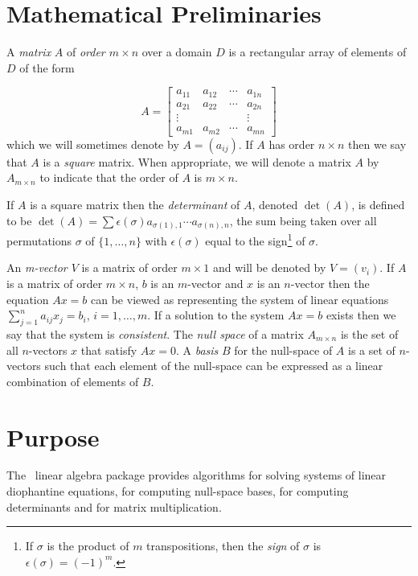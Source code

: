 \section{Mathematical Preliminaries}
A {\em matrix} $A$ of {\em order $m \times n$} over a domain $D$ is a
rectangular array of elements of $D$ of the form

$$A = \left[
\begin{array}{cccc}
a_{11} & a_{12} & \cdots & a_{1n} \\
a_{21} & a_{22} & \cdots & a_{2n} \\
\vdots &        &        & \vdots \\
a_{m1} & a_{m2} & \cdots & a_{mn}
\end{array}
\right]$$
which we will sometimes denote by $A = (a_{ij})$.  If $A$ has order $n
\times n$ then we say that $A$ is a {\em square} matrix.  When
appropriate, we will denote a matrix $A$ by $A_{m \times n}$ to
indicate that the order of $A$ is $m \times n$.

If $A$ is a square matrix then the {\em determinant} of $A$, denoted
$\det(A)$, is defined to be $\det(A) =
\sum \epsilon(\sigma)a_{\sigma(1),1}\cdots a_{\sigma(n),n}$,
the sum being taken over all permutations $\sigma$ of $\{1,\ldots,n\}$
with $\epsilon(\sigma)$ equal to the sign\footnote{If $\sigma$ is the
product of $m$ transpositions, then the {\em sign} of $\sigma$ is
$\epsilon(\sigma) = (-1)^m$.} of $\sigma$.

An {\em m-vector $V$} is a matrix of order $m \times 1$ and will be
denoted by $V = (v_i)$. If $A$ is a matrix of order $m \times n$, $b$
is an $m$-vector and $x$ is an $n$-vector then the equation $Ax = b$
can be viewed as representing the system of linear equations
$\sum_{j=1}^n a_{ij}x_j = b_i$, $i = 1,\ldots,m$. If a solution to the
system $Ax = b$ exists then we say that the system is {\em
consistent}. The {\em null space} of a matrix $A_{m \times n}$ is the
set of all $n$-vectors $x$ that satisfy $Ax = 0$. A {\em basis} $B$
for the null-space of $A$ is a set of $n$-vectors such that each
element of the null-space can be expressed as a linear combination of
elements of $B$.

\section{Purpose}
The \saclib\ linear algebra package provides algorithms for solving
systems of linear diophantine equations, for computing null-space
bases, for computing determinants and for matrix multiplication.

